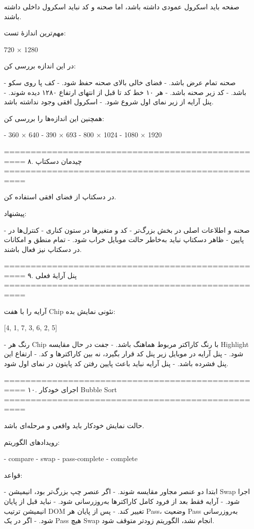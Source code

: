 صفحه باید اسکرول عمودی داشته باشد، اما صحنه و کد نباید اسکرول داخلی داشته باشند.

مهم‌ترین اندازهٔ تست:

720 × 1280

در این اندازه بررسی کن:

- صحنه تمام عرض باشد.
- فضای خالی بالای صحنه حفظ شود.
- کف پا روی سکو باشد.
- کد زیر صحنه باشد.
- هر ۱۰ خط کد تا قبل از انتهای ارتفاع ۱۲۸۰ دیده شوند.
- پنل آرایه از زیر نمای اول شروع شود.
- اسکرول افقی وجود نداشته باشد.

همچنین این اندازه‌ها را بررسی کن:

- 360 × 640
- 390 × 693
- 800 × 1024
- 1080 × 1920

==================================================
۸. چیدمان دسکتاپ
==================================================

در دسکتاپ از فضای افقی استفاده کن.

پیشنهاد:

- صحنه و اطلاعات اصلی در بخش بزرگ‌تر
- کد و متغیرها در ستون کناری
- کنترل‌ها در پایین
- ظاهر دسکتاپ نباید به‌خاطر حالت موبایل خراب شود.
- تمام منطق و امکانات در دسکتاپ نیز فعال باشند.

==================================================
۹. پنل آرایهٔ فعلی
==================================================

آرایه را با هفت Chip نئونی نمایش بده:

[4, 1, 7, 3, 6, 2, 5]

- رنگ هر Chip با رنگ کاراکتر مربوط هماهنگ باشد.
- جفت در حال مقایسه Highlight شود.
- پنل آرایه در موبایل زیر پنل کد قرار بگیرد، نه بین کاراکترها و کد.
- ارتفاع این پنل فشرده باشد.
- پنل آرایه نباید باعث پایین رفتن کد پایتون در نمای اول شود.

==================================================
۱۰. اجرای خودکار Bubble Sort
==================================================

حالت نمایش خودکار باید واقعی و مرحله‌ای باشد.

رویدادهای الگوریتم:

- compare
- swap
- pass-complete
- complete

قواعد:

- ابتدا دو عنصر مجاور مقایسه شوند.
- اگر عنصر چپ بزرگ‌تر بود، انیمیشن Swap اجرا شود.
- آرایه فقط بعد از فرود کامل کاراکترها به‌روزرسانی شود.
- نباید قبل از پایان انیمیشن ترتیب DOM تغییر کند.
- پس از پایان هر Pass، وضعیت Pass به‌روزرسانی شود.
- اگر در یک Pass هیچ Swap انجام نشد، الگوریتم زودتر متوقف شود.

